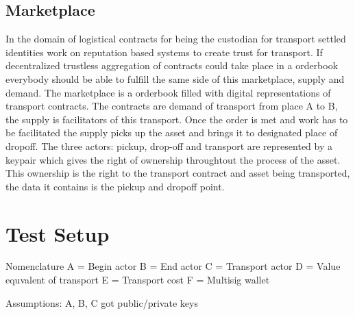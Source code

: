 \documentclass[Nomencl]{DylanMaster}
\begin{document}
\subsection{Marketplace}

In the domain of logistical contracts for being the custodian for transport settled identities work on reputation based systems to create trust for transport. If decentralized trustless aggregation of contracts could take place in a orderbook everybody should be able to fulfill the same side of this marketplace, supply and demand.
The marketplace is a orderbook filled with digital representations of transport contracts. The contracts are demand of transport from place A to B, the supply is facilitators of this transport. Once the order is met and work has to be facilitated the supply picks up the asset and brings it to designated place of dropoff. The three actors: pickup, drop-off and transport are represented by a keypair which gives the right of ownership throughtout the process of the asset. This ownership is the right to the transport contract and asset being transported, the data it contains is the pickup and dropoff point.

\section{Test Setup}

Nomenclature
A = Begin actor
B = End actor
C = Transport actor
D = Value equvalent of transport
E = Transport cost
F = Multisig wallet

Assumptions:
A, B, C got public/private keys
\end{document}

